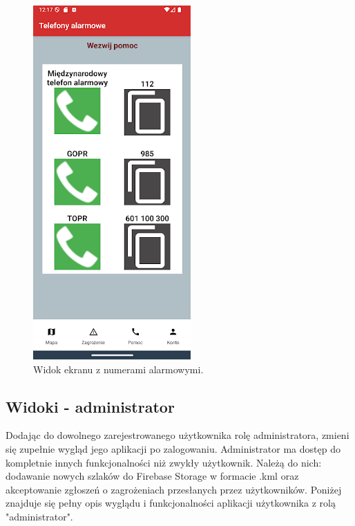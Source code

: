 \begin{figure}[H]
    \centering
    \includegraphics[scale=0.6]{img/imp/widok-telefony.png}
    \caption{Widok ekranu z numerami alarmowymi.}
    \label{widok:telefony}
\end{figure}

\subsection{Widoki - administrator}
Dodając do dowolnego zarejestrowanego użytkownika rolę administratora, zmieni się zupełnie wygląd jego aplikacji po zalogowaniu. Administrator ma dostęp do kompletnie innych funkcjonalności niż zwykły użytkownik. Należą do nich: dodawanie nowych szlaków do Firebase Storage w formacie .kml oraz akceptowanie zgłoszeń o zagrożeniach przesłanych przez użytkowników. Poniżej znajduje się pełny opis wyglądu i funkcjonalności aplikacji użytkownika z rolą "administrator".
\\

